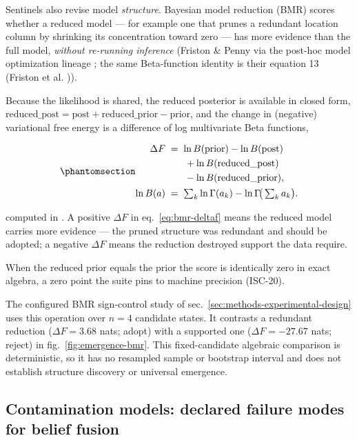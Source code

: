 \documentclass[
  english,
]{article}
\theoremstyle{plain}
\theoremstyle{definition}
\theoremstyle{remark}
\theoremstyle{definition}
\begin{document}
Sentinels also revise model \emph{structure}. Bayesian model reduction
(BMR) scores whether a reduced model --- for example one that prunes a
redundant location column by shrinking its concentration toward zero ---
has more evidence than the full model, \emph{without re-running
inference} (Friston \& Penny via the post-hoc model optimization lineage
\citep{friston2011post}; the same Beta-function identity is their
equation 13 (Friston et al. \citeyearpar{friston2024federated})).

Because the likelihood is shared, the reduced posterior is available in
closed form,
\(\text{reduced\_post} = \text{post} + \text{reduced\_prior} - \text{prior}\),
and the change in (negative) variational free energy is a difference of
log multivariate Beta functions,

\begin{equation}\protect\phantomsection\label{eq:bmr-deltaf}{\begin{aligned}
\Delta F
&\;=\; \ln B(\text{prior}) - \ln B(\text{post})\\
&\qquad + \ln B(\text{reduced\_post})\\
&\qquad - \ln B(\text{reduced\_prior}),\\
\ln B(a)
&\;=\; \textstyle\sum_k \ln\Gamma(a_k)
 - \ln\Gamma\!\big(\sum_k a_k\big).
\end{aligned}}\end{equation}

computed in . A positive
\(\Delta F\) in eq.~\ref{eq:bmr-deltaf} means the reduced model carries
more evidence --- the pruned structure was redundant and should be
adopted; a negative \(\Delta F\) means the reduction destroyed support
the data require.

When the reduced prior equals the prior the score is identically zero in
exact algebra, a zero point the suite pins to machine precision
(ISC-20).

The configured BMR sign-control study of
sec.~\ref{sec:methods-experimental-design} uses this operation over
\(n = 4\) candidate states. It contrasts a redundant reduction
(\(\Delta F = 3.68\) nats; adopt) with a supported one
(\(\Delta F = -27.67\) nats; reject) in fig.~\ref{fig:emergence-bmr}.
This fixed-candidate algebraic comparison is deterministic, so it has no
resampled sample or bootstrap interval and does not establish structure
discovery or universal emergence.

\subsection{Contamination models: declared failure modes for belief
fusion}\label{sec:methods-contamination}
\end{document}
